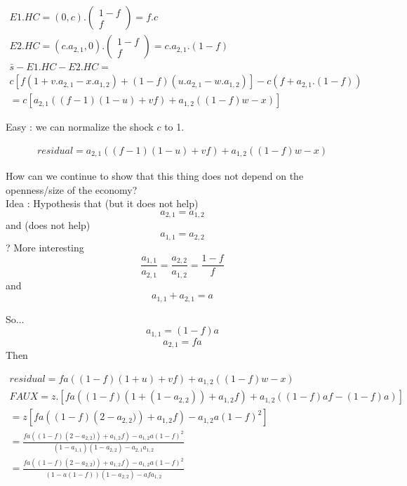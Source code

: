 \documentclass[11pt,a4paper]{article}
\begin{document}
\begin{gather*}
E1.HC = \left(0,c\right).\left(\begin{matrix}1-f\\f\end{matrix}\right)=f.c
\\
E2.HC=\left(c.a_{2,1},0\right).\left(\begin{matrix}1-f\\f\end{matrix}\right)=c.a_{2,1}.\left(1-f\right)
\\ 
\bar{s}-E1.HC-E2.HC=
\\
c\left[f\left(1+v.a_{2,1}-x.a_{1,2}\right)+\left(1-f\right)\left(u.a_{2,1}-w.a_{1,2}\right)\right]-c\left(f+a_{2,1}.\left(1-f\right)\right)
\\
=c\left[a_{2,1}\left(\left(f-1\right)\left(1-u\right)+vf\right)+a_{1,2}\left(\left(1-f\right)w-x\right)\right]
\end{gather*}

Easy : we can normalize the shock $c$ to 1. 

\begin{gather}
residual=a_{2,1}\left(\left(f-1\right)\left(1-u\right)+vf\right)+a_{1,2}\left(\left(1-f\right)w-x\right)
\end{gather}

How can we continue to show that this thing does not depend on the openness/size of the economy?
\\
 Idea : Hypothesis that (but it does not help) $$a_{2,1}=a_{1,2}$$ and (does not help)$$a_{1,1}=a_{2,2}$$ ? 
More interesting $$\frac{a_{1,1}}{a_{2,1}}=\frac{a_{2,2}}{a_{1,2}}=\frac{1-f}{f}$$ 
and 
$$a_{1,1}+a_{2,1}=a$$

So...
$$a_{1,1}=(1-f)a$$
$$a_{2,1}=fa$$
Then 

\begin{gather}
residual=fa\left(\left(1-f\right)\left(1+u\right)+vf\right)+a_{1,2}\left(\left(1-f\right)w-x\right) \\
FAUX=z.\left[fa\left(\left(1-f\right)\left(1+(1-a_{2,2})\right)+a_{1,2}f\right)+a_{1,2}\left(\left(1-f\right)af-(1-f)a\right)\right] \\
= z\left[fa\left(\left(1-f\right)\left(2-a_{2,2})\right)+a_{1,2}f\right)-a_{1,2}a\left(1-f\right)^2\right] \\
= \frac{fa\left(\left(1-f\right)\left(2-a_{2,2})\right)+a_{1,2}f\right)-a_{1,2}a\left(1-f\right)^2}{\left(1-a_{1,1}\right)\left(1-a_{2,2}\right)-a_{2,1}a_{1,2}} \\
= \frac{fa\left(\left(1-f\right)\left(2-a_{2,2})\right)+a_{1,2}f\right)-a_{1,2}a\left(1-f\right)^2}{\left(1-a(1-f)\right)\left(1-a_{2,2}\right)-afa_{1,2}}
\end{gather}
\end{document}
